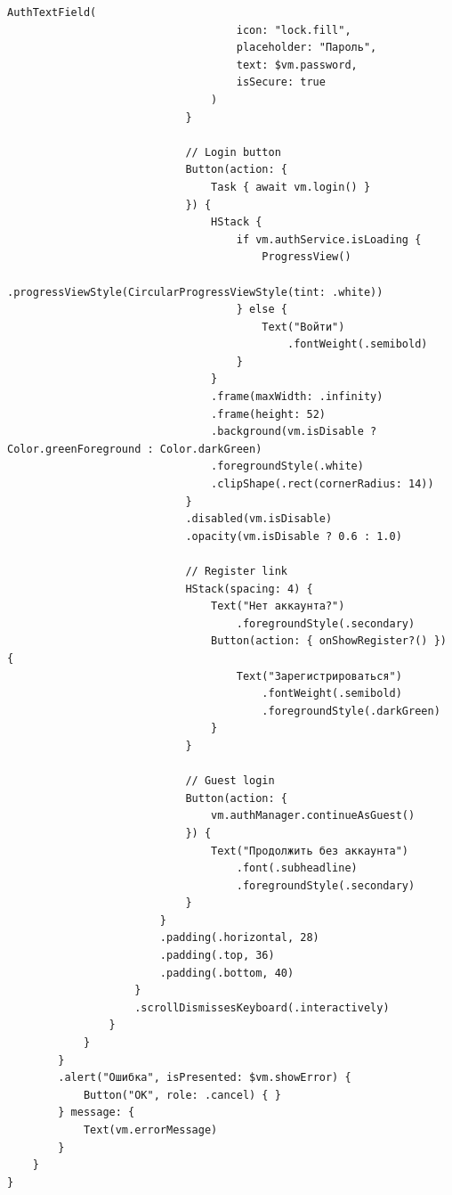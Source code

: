 \begin{lstlisting}[basicstyle=\tiny\ttfamily,breaklines=true]
                                AuthTextField(
                                    icon: "lock.fill",
                                    placeholder: "Пароль",
                                    text: $vm.password,
                                    isSecure: true
                                )
                            }

                            // Login button
                            Button(action: {
                                Task { await vm.login() }
                            }) {
                                HStack {
                                    if vm.authService.isLoading {
                                        ProgressView()
                                            .progressViewStyle(CircularProgressViewStyle(tint: .white))
                                    } else {
                                        Text("Войти")
                                            .fontWeight(.semibold)
                                    }
                                }
                                .frame(maxWidth: .infinity)
                                .frame(height: 52)
                                .background(vm.isDisable ? Color.greenForeground : Color.darkGreen)
                                .foregroundStyle(.white)
                                .clipShape(.rect(cornerRadius: 14))
                            }
                            .disabled(vm.isDisable)
                            .opacity(vm.isDisable ? 0.6 : 1.0)

                            // Register link
                            HStack(spacing: 4) {
                                Text("Нет аккаунта?")
                                    .foregroundStyle(.secondary)
                                Button(action: { onShowRegister?() }) {
                                    Text("Зарегистрироваться")
                                        .fontWeight(.semibold)
                                        .foregroundStyle(.darkGreen)
                                }
                            }

                            // Guest login
                            Button(action: {
                                vm.authManager.continueAsGuest()
                            }) {
                                Text("Продолжить без аккаунта")
                                    .font(.subheadline)
                                    .foregroundStyle(.secondary)
                            }
                        }
                        .padding(.horizontal, 28)
                        .padding(.top, 36)
                        .padding(.bottom, 40)
                    }
                    .scrollDismissesKeyboard(.interactively)
                }
            }
        }
        .alert("Ошибка", isPresented: $vm.showError) {
            Button("OK", role: .cancel) { }
        } message: {
            Text(vm.errorMessage)
        }
    }
}
\end{lstlisting}

